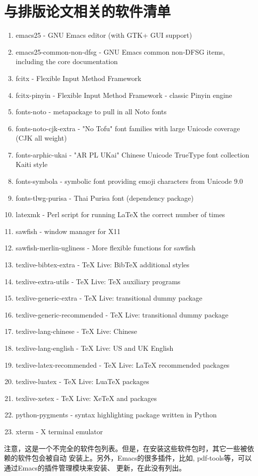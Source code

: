 \chapter{与排版论文相关的软件清单}%
\label{app:pkg}

\begin{enumerate}
\item emacs25 - GNU Emacs editor (with GTK+ GUI support)
\item emacs25-common-non-dfsg - GNU Emacs common non-DFSG items, including the core documentation
\item fcitx - Flexible Input Method Framework
\item fcitx-pinyin - Flexible Input Method Framework - classic Pinyin engine
\item fonts-noto - metapackage to pull in all Noto fonts
\item fonts-noto-cjk-extra - "No Tofu" font families with large Unicode coverage (CJK all weight)
\item fonts-arphic-ukai - "AR PL UKai" Chinese Unicode TrueType font collection Kaiti style
\item fonts-symbola - symbolic font providing emoji characters from Unicode 9.0
\item fonts-tlwg-purisa - Thai Purisa font (dependency package)
\item latexmk - Perl script for running LaTeX the correct number of times
\item sawfish - window manager for X11
\item sawfish-merlin-ugliness - More flexible functions for sawfish
\item texlive-bibtex-extra - TeX Live: BibTeX additional styles
\item texlive-extra-utils - TeX Live: TeX auxiliary programs
\item texlive-generic-extra - TeX Live: transitional dummy package
\item texlive-generic-recommended - TeX Live: transitional dummy package
\item texlive-lang-chinese - TeX Live: Chinese
\item texlive-lang-english - TeX Live: US and UK English
\item texlive-latex-recommended - TeX Live: LaTeX recommended packages
\item texlive-luatex - TeX Live: LuaTeX packages
\item texlive-xetex - TeX Live: XeTeX and packages
\item python-pygments - syntax highlighting package written in Python   
\item xterm - X terminal emulator
\end{enumerate}

\vspace{2ex}

注意，这是一个不完全的软件包列表。但是，在安装这些软件包时，其它一些被依赖的软件包会被自动
安装上。另外，Emacs的很多插件，比如\auctex{}, pdf-tools等，可以通过Emacs的插件管理模块来安装、
更新，在此没有列出。

